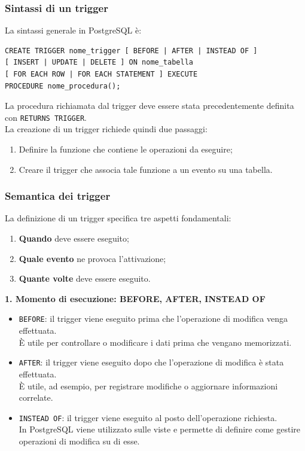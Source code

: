 \subsubsection{Sintassi di un trigger}

La sintassi generale in PostgreSQL è:

\begin{verbatim}
CREATE TRIGGER nome_trigger [ BEFORE | AFTER | INSTEAD OF ]
[ INSERT | UPDATE | DELETE ] ON nome_tabella
[ FOR EACH ROW | FOR EACH STATEMENT ] EXECUTE 
PROCEDURE nome_procedura();
\end{verbatim}

\noindent
La procedura richiamata dal trigger deve essere stata
precedentemente definita con \texttt{RETURNS TRIGGER}.\\
La creazione di un trigger richiede quindi due passaggi:
\begin{enumerate}
    \item Definire la funzione che contiene
    le operazioni da eseguire;
    \item Creare il trigger che associa tale funzione
    a un evento su una tabella.
\end{enumerate}

\subsubsection{Semantica dei trigger}

La definizione di un trigger specifica tre aspetti
fondamentali:
\begin{enumerate}
    \item \textbf{Quando} deve essere eseguito;
    \item \textbf{Quale evento} ne provoca l'attivazione;
    \item \textbf{Quante volte} deve essere eseguito.
\end{enumerate}

\noindent
\textbf{1. Momento di esecuzione: BEFORE, AFTER, INSTEAD OF}

\begin{itemize}
    \item \texttt{BEFORE}: il trigger viene eseguito
    prima che l'operazione di modifica venga effettuata.\\
    È utile per controllare o modificare i dati
    prima che vengano memorizzati.

    \item \texttt{AFTER}: il trigger viene eseguito
    dopo che l'operazione di modifica è stata effettuata.\\
    È utile, ad esempio, per registrare modifiche
    o aggiornare informazioni correlate.

    \item \texttt{INSTEAD OF}: il trigger viene eseguito
    al posto dell'operazione richiesta.\\
    In PostgreSQL viene utilizzato sulle viste
    e permette di definire come gestire
    operazioni di modifica su di esse.
\end{itemize}

